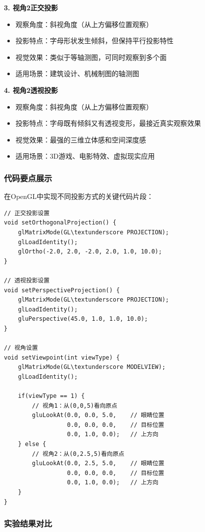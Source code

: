 \documentclass[a4paper]{article}
\begin{document}
\textbf{3. 视角2正交投影}
\begin{itemize}
    \item 观察角度：斜视角度（从上方偏移位置观察）
    \item 投影特点：字母形状发生倾斜，但保持平行投影特性
    \item 视觉效果：类似于等轴测图，可同时观察到多个面
    \item 适用场景：建筑设计、机械制图的轴测图
\end{itemize}

\textbf{4. 视角2透视投影}
\begin{itemize}
    \item 观察角度：斜视角度（从上方偏移位置观察）
    \item 投影特点：字母既有倾斜又有透视变形，最接近真实观察效果
    \item 视觉效果：最强的三维立体感和空间深度感
    \item 适用场景：3D游戏、电影特效、虚拟现实应用
\end{itemize}

\subsubsection{代码要点展示}

在OpenGL中实现不同投影方式的关键代码片段：

\begin{lstlisting}[caption={投影矩阵设置}]
// 正交投影设置
void setOrthogonalProjection() {
    glMatrixMode(GL\textunderscore PROJECTION);
    glLoadIdentity();
    glOrtho(-2.0, 2.0, -2.0, 2.0, 1.0, 10.0);
}

// 透视投影设置
void setPerspectiveProjection() {
    glMatrixMode(GL\textunderscore PROJECTION);
    glLoadIdentity();
    gluPerspective(45.0, 1.0, 1.0, 10.0);
}

// 视角设置
void setViewpoint(int viewType) {
    glMatrixMode(GL\textunderscore MODELVIEW);
    glLoadIdentity();
    
    if(viewType == 1) {
        // 视角1：从(0,0,5)看向原点
        gluLookAt(0.0, 0.0, 5.0,    // 眼睛位置
                  0.0, 0.0, 0.0,    // 目标位置
                  0.0, 1.0, 0.0);   // 上方向
    } else {
        // 视角2：从(0,2.5,5)看向原点
        gluLookAt(0.0, 2.5, 5.0,    // 眼睛位置
                  0.0, 0.0, 0.0,    // 目标位置
                  0.0, 1.0, 0.0);   // 上方向
    }
}
\end{lstlisting}

\subsubsection{实验结果对比}
\end{document}
